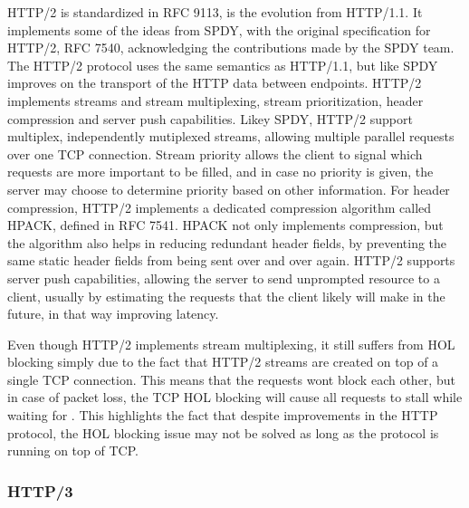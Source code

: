 \documentclass[english, 12pt, a4paper, elec, utf8, a-2b, online]{aaltothesis}
\begin{document}
HTTP/2 is standardized in RFC 9113\cite{rfc9113}, is the evolution from HTTP/1.1.
It implements some of the ideas from SPDY, with the original specification for
HTTP/2, RFC 7540\cite{rfc7540}, acknowledging the contributions made by the SPDY
team. The HTTP/2 protocol uses the same semantics as HTTP/1.1, but like SPDY
improves on the transport of the HTTP data between endpoints. HTTP/2 implements
streams and stream multiplexing, stream prioritization, header compression and
server push capabilities. Likey SPDY, HTTP/2 support multiplex, independently
mutiplexed streams, allowing multiple parallel requests over one TCP connection.
Stream priority allows the client to signal which requests are more important to
be filled, and in case no priority is given, the server may choose to determine
priority based on other information\cite{rfc9113}. For header compression, HTTP/2 implements a
dedicated compression algorithm called HPACK, defined in RFC 7541\cite{rfc7541}.
HPACK not only implements compression, but the algorithm also helps in reducing
redundant header fields, by preventing the same static header fields from
being sent over and over again\cite{rfc7541}. HTTP/2 supports server push capabilities,
allowing the server to send unprompted resource to a client, usually by estimating
the requests that the client likely will make in the future, in that way improving
latency\cite{rfc9114}.

Even though HTTP/2 implements stream multiplexing, it still suffers from HOL blocking
simply due to the fact that HTTP/2 streams are created on top of a single TCP
connection. This means that the requests wont block each other, but in case of
packet loss, the TCP HOL blocking will cause all requests to stall while waiting
for \cite{rfc9113}. This highlights the fact that despite improvements in the
HTTP protocol, the HOL blocking issue may not be solved as long as the protocol
is running on top of TCP.

\subsubsection{HTTP/3}
\end{document}
